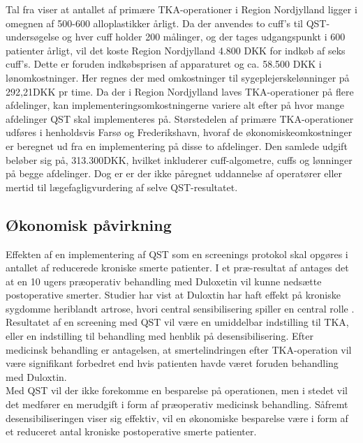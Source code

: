Tal fra  viser at antallet af primære TKA-operationer i Region Nordjylland ligger i omegnen af 500-600 alloplastikker årligt. Da der anvendes to cuff's til QST-undersøgelse og hver cuff holder 200 målinger, og der tages udgangspunkt i 600 patienter årligt, vil det koste Region Nordjylland 4.800 DKK for indkøb af seks cuff's. Dette er foruden indkøbsprisen af apparaturet og ca. 58.500 DKK i lønomkostninger. Her regnes der med omkostninger til sygeplejerskelønninger på 292,21DKK pr time. \citep{DST1} \citep{DST2} Da der i Region Nordjylland laves TKA-operationer på flere afdelinger, kan implementeringsomkostningerne variere alt efter på hvor mange afdelinger QST skal implementeres på. Størstedelen af primære TKA-operationer udføres i henholdsvis Farsø og Frederikshavn, hvoraf de økonomiskeomkostninger er beregnet ud fra en implementering på disse to afdelinger. Den samlede udgift beløber sig på, 313.300DKK, hvilket inkluderer cuff-algometre, cuffs og lønninger på begge afdelinger. Dog er er der ikke påregnet uddannelse af operatører eller mertid til lægefagligvurdering af selve QST-resultatet.

\subsection{Økonomisk påvirkning} 
Effekten af en implementering af QST som en screenings protokol skal opgøres i antallet af reducerede kroniske smerte patienter. I et præ-resultat af  antages det at en 10 ugers præoperativ behandling med Duloxetin vil kunne nedsætte postoperative smerter. Studier har vist at Duloxtin har haft effekt på kroniske sygdomme heriblandt artrose, hvori central sensibilisering spiller en central rolle \citep{Blikman2016}. Resultatet af en screening med QST vil være en umiddelbar indstilling til TKA, eller en indstilling til behandling med henblik på desensibilisering. Efter medicinsk behandling er antagelsen, at smertelindringen efter TKA-operation vil være signifikant forbedret end hvis patienten havde været foruden behandling med Duloxtin. \citep{Blikman2016} \\
Med QST vil der ikke forekomme en besparelse på operationen, men i stedet vil det medfører en merudgift i form af præoperativ medicinsk behandling. Såfremt desensibiliseringen viser sig effektiv, vil en økonomiske besparelse være i form af et reduceret antal kroniske postoperative smerte patienter.

